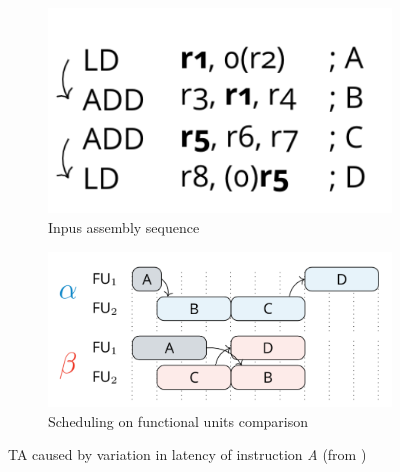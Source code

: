\begin{figure}[htbp]
    \centering
    \begin{subfigure}[t]{0.3\textwidth}
        \centering
        \includegraphics[width=\textwidth]{figures/first-TA-ex-input.png}
        \caption{Inpus assembly sequence}
        \label{fig:TA1-code}
    \end{subfigure}
    \hfill
    \begin{subfigure}[t]{0.55\textwidth}
        \centering
        \includegraphics[width=\textwidth]{figures/first-TA-ex-trace.png}
        \caption{Scheduling on functional units comparison}
        \label{fig:TA1-trace}
    \end{subfigure}
    \caption{TA caused by variation in latency of instruction \textit{A} (from \cite{binder_definitions_2022})}
    \label{fig:TA1}
\end{figure}